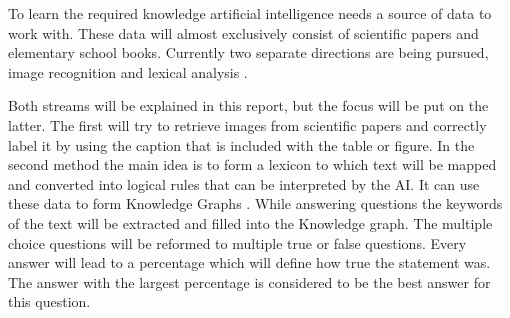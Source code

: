 To learn the required knowledge artificial intelligence needs a source of data to work with.
These data will almost exclusively consist of scientific papers and elementary school books. 
Currently two separate directions are being pursued, image recognition \cite{pdffigures2} and lexical analysis \cite{probseman,sciencequestions}.

Both streams will be explained in this report, but the focus will be put on the latter.
The first will try to retrieve images from scientific papers and correctly label it by using the caption that is included with the table or figure.
In the second method the main idea is to form a lexicon to which text will be mapped and converted into logical rules that can be interpreted by the AI.
It can use these data to form Knowledge Graphs \cite{construction}.
While answering questions the keywords of the text will be extracted and filled into the Knowledge graph.
The multiple choice questions will be reformed to multiple true or false questions. 
Every answer will lead to a percentage which will define how true the statement was.
The answer with the largest percentage is considered to be the best answer for this question.
